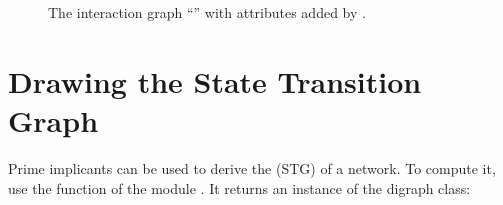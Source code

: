 \documentclass[letterpaper,10pt,english]{sphinxmanual}
\begin{document}
\begin{figure}[htbp]
\centering
\capstart

\noindent{}
\caption{The interaction graph “” with attributes added by {\hyperref[\detokenize{InteractionGraphs:add-style-default}]{}}.}\label{\detokenize{Manual:figure09}}\label{\detokenize{Manual:id13}}\end{figure}


\section{Drawing the State Transition Graph}
\label{\detokenize{Manual:drawing-the-state-transition-graph}}
Prime implicants can be used to derive the  (STG) of a network.
To compute it, use the function {\hyperref[\detokenize{StateTransitionGraphs:primes2stg}]{}} of the module {\hyperref[\detokenize{StateTransitionGraphs:statetransitiongraphs}]{}}.
It returns an instance of the {\hyperref[\detokenize{Installation:installation-networkx}]{}} digraph class:

\begin{sphinxVerbatim}[commandchars=\\\{\}]
     
  \PYG{p}{[} \PYG{p}{]}
  
  
   
\end{sphinxVerbatim}
\end{document}
